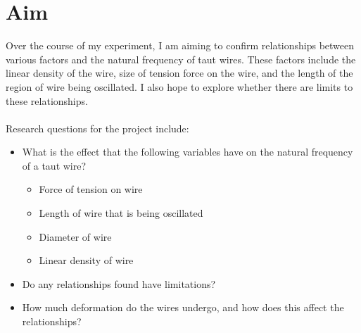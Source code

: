 \section{Aim}
    Over the course of my experiment, I am aiming to confirm relationships between various factors and the natural frequency of taut wires. These factors include the linear density of the wire, size of tension force on the wire, and the length of the region of wire being oscillated. I also hope to explore whether there are limits to these relationships. \\ \\
    Research questions for the project include:
    \begin{itemize}
        \item What is the effect that the following variables have on the natural frequency of a taut wire?
            \begin{itemize}
                \item Force of tension on wire
                \item Length of wire that is being oscillated
                \item Diameter of wire
                \item Linear density of wire
            \end{itemize}
        \item Do any relationships found have limitations?
        \item How much deformation do the wires undergo, and how does this affect the relationships?
    \end{itemize}